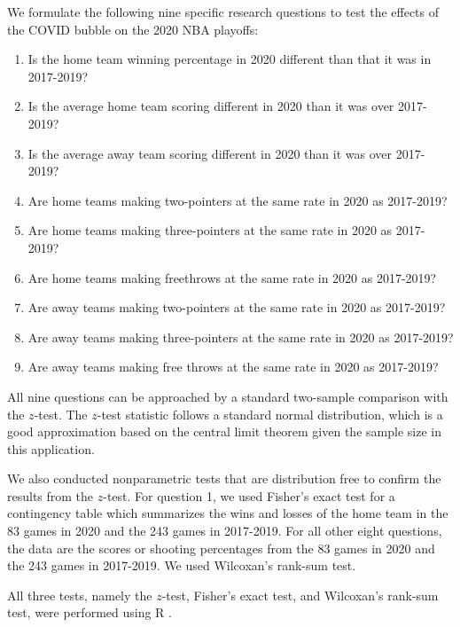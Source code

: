 \documentclass[10pt]{article}
\begin{document}
We formulate the following nine specific research questions to test
the effects of the COVID bubble on the 2020 NBA playoffs:

\begin{enumerate}
\def\labelenumi{\arabic{enumi}.}
\item
  Is the home team winning percentage in 2020 different than that it was in 2017-2019?
\item
  Is the average home team scoring different in 2020 than it was over 2017-2019?
\item
  Is the average away team scoring different in 2020 than it was over 2017-2019?
\item
  Are home teams making two-pointers at the same rate in 2020 as 2017-2019?
\item
  Are home teams making three-pointers at the same rate in 2020 as 2017-2019?
\item
  Are home teams making freethrows at the same rate in 2020 as 2017-2019?
\item
  Are away teams making two-pointers at the same rate in 2020 as 2017-2019?
\item
  Are away teams making three-pointers at the same rate in 2020 as 2017-2019?
\item
  Are away teams making free throws at the same rate in 2020 as 2017-2019?
\end{enumerate}

All nine questions can be approached by a standard two-sample
comparison with the \(z\)-test. The \(z\)-test statistic follows a
standard normal distribution, which is a good approximation based on
the central limit theorem given the sample size in this application.

We also conducted nonparametric tests that are distribution free to
confirm the results from the \(z\)-test. For question 1, we used
Fisher's exact test for a contingency table which summarizes the wins
and losses of the home team in the 83 games in 2020 and the 243 games
in 2017-2019. For all other eight questions, the data are the scores
or shooting percentages from the 83 games in 2020 and the 243 games in
2017-2019. We used Wilcoxan's rank-sum test.

All three tests, namely the \(z\)-test, Fisher's exact test, and
Wilcoxan's rank-sum test, were performed using R \citep{R}.
\end{document}

